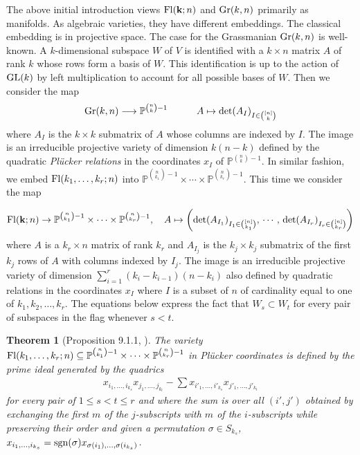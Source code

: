 \documentclass[12pt]{extarticle}
\newtheorem{theorem}{Theorem}
\theoremstyle{definition}
\numberwithin{theorem}{section}
\newcommand{\PP}{\mathbb{P}}
\begin{document}
The above initial introduction views  ${\rm Fl}({\bf k};n)$ and ${\rm Gr}(k,n)$ primarily as manifolds. As algebraic varieties, they have different embeddings. The classical embedding is in projective space. The case for the Grassmanian ${\rm Gr}(k,n)$ is well-known. A $k$-dimensional subspace $W$ of $V$ is identified with a $k\times n$ matrix $A$ of rank $k$ whose rows form a basis of $W$. This identification is up to the action of ${\rm GL}(k)$ by left multiplication to account for all possible bases of $W$. Then we consider the map
$${\rm Gr}(k,n) \longrightarrow \mathbb{P}^{\binom{n}{k} - 1} \quad \quad \quad A \mapsto \det(A_I)_{I \in \binom{[n]}{k}}$$
where $A_I$ is the $k \times k$ submatrix of $A$
whose columns are indexed by $I$. The image is an irreducible projective variety of dimension $k(n-k)$ defined by the quadratic {\it Pl\"ucker relations} \cite[Section 9.1]{fulton} in the coordinates $x_I$ of $\mathbb{P}^{\binom{n}{k}-1}$. In similar fashion, we embed ${\rm Fl}(k_1, \ldots, k_r;n)$ into $\mathbb{P}^{\binom{n}{k_1}-1} \times \cdots \times \PP^{\binom{n}{k_r}-1}$. This time we consider the map

\begin{align} \label{flag-pluecker}
{\rm Fl}({\bf k}; n) \to \mathbb{P}^{\binom{n}{k_1}-1} \times \cdots \times \PP^{\binom{n}{k_r}-1}, \quad
 A \mapsto \left(\det(A_{I_1})_{I_1 \in \binom{[n]}{k_1}},\, \cdots ,\, \det(A_{I_r})_{I_r \in \binom{[n]}{k_r}}\right)
\end{align}
where $A$ is a $k_r \times n$ matrix of rank $k_r$ and $A_{I_j}$ is the $k_j \times k_j$ submatrix of the first $k_j$ rows of $A$ with columns indexed by $I_j$. The image is an irreducible projective variety of dimension $\sum_{i=1}^r (k_i-k_{i-1})(n-k_i)$ also defined by quadratic relations in the coordinates $x_I$ where $I$ is a subset of $n$ of cardinality equal to one of $k_1, k_2, \ldots, k_r$. The equations below express the fact that
$W_s \subset W_t$ for every pair of subspaces in the flag whenever $s < t$.
\begin{theorem}[Proposition 9.1.1, \cite{fulton}] \label{thm:pluecker}
    The variety ${\rm Fl}(k_1, \ldots, k_r; n) \subseteq  \mathbb{P}^{\binom{n}{k_1}-1} \times \cdots \times \PP^{\binom{n}{k_r}-1}$ in Pl\"{u}cker coordinates is defined by the prime ideal generated by the quadrics
    \begin{align*}
        x_{i_1, \ldots, i_{k_s}} 
        x_{j_1, \ldots, j_{k_t}}
        - \sum x_{i'_1, \ldots, i'_{k_s}} x_{j'_1, \ldots, j'_{k_t}}
    \end{align*}
    for every pair of $1\leq s < t \leq r$ and 
    where the sum is over all $(i', j')$ obtained by exchanging the first $m$ of the $j$-subscripts with $m$ of the $i$-subscripts while preserving their order and given a permutation $\sigma \in S_{k_s}$, $x_{i_1, \ldots, i_{k_s}} = {\rm sgn}(\sigma) x_{\sigma(i_1), \ldots, \sigma(i_{k_s})}$.
\end{theorem}
\end{document}
